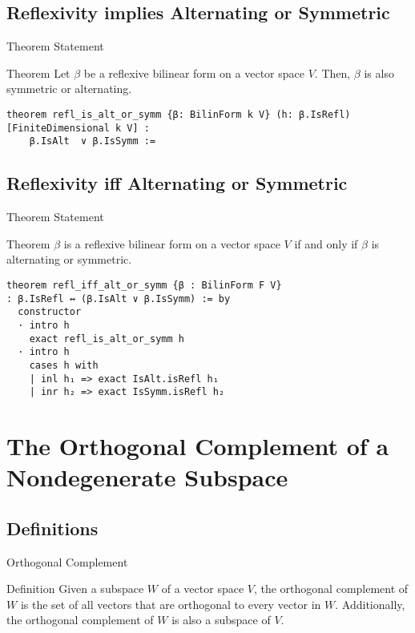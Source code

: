\documentclass[svgnames]{beamer}
\begin{document}
\subsection{Reflexivity implies Alternating or Symmetric}
\begin{frame}[label={sec:o}, fragile]{Theorem Statement}
\begin{block}{Theorem}
Let $\beta$ be a reflexive bilinear form on a vector space $V$. Then, $\beta$ is also symmetric or alternating.
\end{block}

{\scriptsize
\begin{verbatim}
theorem refl_is_alt_or_symm {β: BilinForm k V} (h: β.IsRefl) 
[FiniteDimensional k V] :
    β.IsAlt  ∨ β.IsSymm :=
\end{verbatim}
}

\end{frame}

\subsection{Reflexivity iff Alternating or Symmetric}
\begin{frame}[label={sec:o}, fragile]{Theorem Statement}
\begin{block}{Theorem}
$\beta$ is a reflexive bilinear form on a vector space $V$ if and only if $\beta$ is alternating or symmetric. 
\end{block}

{\scriptsize
\begin{verbatim}
theorem refl_iff_alt_or_symm {β : BilinForm F V}
: β.IsRefl ↔ (β.IsAlt ∨ β.IsSymm) := by
  constructor 
  · intro h 
    exact refl_is_alt_or_symm h  
  · intro h 
    cases h with 
    | inl h₁ => exact IsAlt.isRefl h₁
    | inr h₂ => exact IsSymm.isRefl h₂ 
\end{verbatim}
}
\end{frame}

\section{The Orthogonal Complement of a Nondegenerate Subspace}
\subsection{Definitions}

\begin{frame}{Orthogonal Complement}
\begin{block}{Definition}
Given a subspace $W$ of a vector space $V$, the orthogonal complement of $W$ is the set of all vectors that are orthogonal to every vector in $W$. Additionally, the orthogonal complement of $W$ is also a subspace of $V$.
\end{block}

\end{frame}
\end{document}
